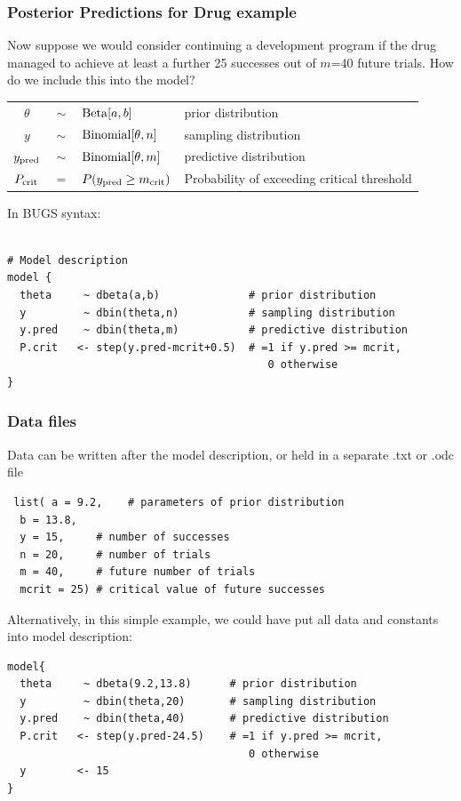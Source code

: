 \begin{frame}[containsverbatim]
\frametitle{Posterior Predictions for Drug example}

Now suppose we would consider continuing a development program if the drug
managed to achieve at least a further 25 successes out of $m$=40 future trials. How do we include this into the model?

\vspace{0.4cm}
\begin{tabular}{ccll}
$\theta$     &$\sim$ & ${\rm Beta}[a,b]$  &     prior distribution\\ [3pt]
$y$         &$\sim$ & ${\rm Binomial}[\theta,n] $       &  sampling distribution    \\ [3pt]
$y_{\rm pred}$    &$\sim$ & ${\rm Binomial}[\theta,m] $  &            predictive distribution \\ [3pt]
$P_{\rm crit}$    &$=$&  $P(y_{\rm pred}    \ge m_{\rm crit}    ) $
& Probability of exceeding critical threshold \\ [10pt]
\end{tabular}

In BUGS syntax:\vspace{-2mm}
{\fontsize{9}{9}\selectfont
\begin{verbatim}

# Model description
model {
  theta     ~ dbeta(a,b)              # prior distribution
  y         ~ dbin(theta,n)           # sampling distribution
  y.pred    ~ dbin(theta,m)           # predictive distribution
  P.crit   <- step(y.pred-mcrit+0.5)  # =1 if y.pred >= mcrit,
                                         0 otherwise
}
\end{verbatim}
}
\end{frame}

\begin{frame}[containsverbatim]

\frametitle{Data files}

Data can be written after the model description, or held in a separate .txt or .odc file

{\fontsize{9}{9}\selectfont
\begin{verbatim}
 list( a = 9.2,    # parameters of prior distribution
  b = 13.8,
  y = 15,     # number of successes
  n = 20,     # number of trials
  m = 40,     # future number of trials
  mcrit = 25) # critical value of future successes
\end{verbatim}
}

Alternatively, in this simple example, we could have put all data and constants into model description:

{\fontsize{9}{9}\selectfont
\begin{verbatim}
model{
  theta     ~ dbeta(9.2,13.8)      # prior distribution
  y         ~ dbin(theta,20)       # sampling distribution
  y.pred    ~ dbin(theta,40)       # predictive distribution
  P.crit   <- step(y.pred-24.5)    # =1 if y.pred >= mcrit,
                                      0 otherwise
  y        <- 15
}
\end{verbatim}
}
\end{frame}

